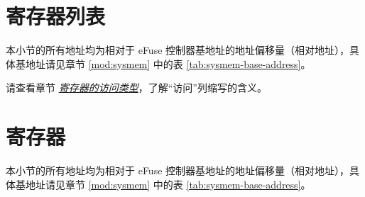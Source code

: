 \documentclass[main\_\_CN.tex]{subfiles}
\begin{document}


\clearpage
\hypertarget{efuse-reg-summ}{}
\section{寄存器列表}
\label{sec:efuse-reg-summ}

本小节的所有地址均为相对于 eFuse 控制器基地址的地址偏移量（相对地址），具体基地址请见章节 \ref{mod:sysmem} \textit{} 中的表 \ref{tab:sysmem-base-address}。

请查看章节 \hyperref[glossary-access-types]{\textit{寄存器的访问类型}}，了解“访问”列缩写的含义。






\clearpage
\section{寄存器}

本小节的所有地址均为相对于 eFuse 控制器基地址的地址偏移量（相对地址），具体基地址请见章节 \ref{mod:sysmem} \textit{} 中的表 \ref{tab:sysmem-base-address}。


\end{document}
